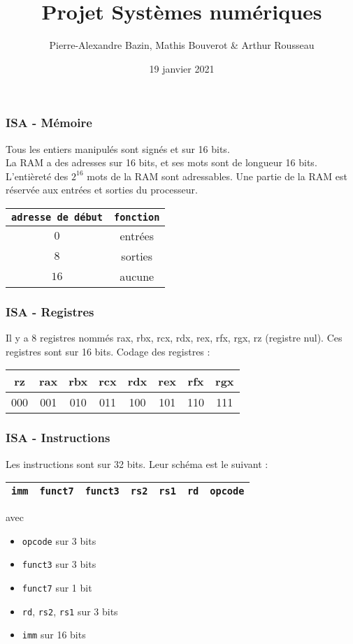 \documentclass[xcolor=pst,10pt,onlymath]{beamer}
\author{Pierre-Alexandre Bazin, Mathis Bouverot \& Arthur Rousseau}
\title{Projet Systèmes numériques}
\date{19 janvier 2021}
\begin{document}
\frame{\titlepage}


\Large
\begin{frame}
    \frametitle{ISA - Mémoire}
    Tous les entiers manipulés sont signés et sur 16 bits.\\
    La RAM a des adresses sur 16 bits, et ses mots sont de longueur 16 bits.
    L'entièreté des $2^{16}$ mots de la RAM sont adressables. 
    Une partie de la RAM est réservée aux entrées et sorties du processeur.
    \begin{center}
    \begin{tabular}{|c|c|}
        \hline
        \texttt{adresse de début} & \texttt{fonction} \\
        \hline
        $0$ & entrées \\
        \hline
        $8$ & sorties \\
        \hline    
        $16$ & aucune \\
        \hline
    \end{tabular}
\end{center}
\end{frame}


\begin{frame}
    \frametitle{ISA - Registres}
    Il y a 8 registres nommés rax, rbx, rcx, rdx, rex, rfx, rgx, rz (registre nul).
    Ces registres sont sur 16 bits. 
    Codage des registres :
    \begin{center}
    \begin{tabular}{|c|c|c|c|c|c|c|c|}
        \hline
        rz  & rax & rbx & rcx & rdx & rex & rfx & rgx \\
        \hline
        000 & 001 & 010 & 011 & 100 & 101 & 110 & 111 \\
        \hline  
    \end{tabular}
\end{center}
\end{frame}


\begin{frame}
    \frametitle{ISA - Instructions}
    Les instructions sont sur 32 bits. Leur schéma est le suivant :
    \begin{center}
    \begin{tabular}{|c|c|c|c|c|c|c|}
        \hline
        \texttt{imm} & \texttt{funct7} & \texttt{funct3} & \texttt{rs2} & \texttt{rs1} & \texttt{rd} & \texttt{opcode} \\
        \hline
    \end{tabular}
    \end{center}
    avec \begin{itemize}
        \item \texttt{opcode} sur 3 bits
        \item \texttt{funct3} sur 3 bits
        \item \texttt{funct7} sur 1 bit 
        \item \texttt{rd}, \texttt{rs2}, \texttt{rs1} sur 3 bits
        \item \texttt{imm} sur 16 bits
    \end{itemize}
\end{frame}
\end{document}
